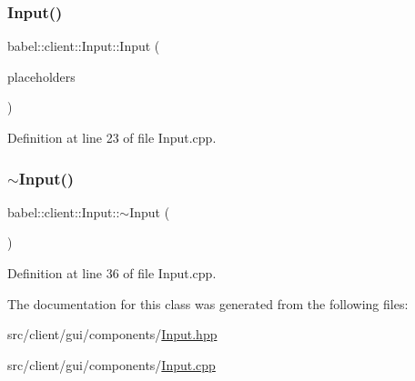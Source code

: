 \subsubsection{\texorpdfstring{Input()}{Input()}\hspace{0.1cm}{\footnotesize\ttfamily [2/2]}}
{\footnotesize\ttfamily babel\+::client\+::\+Input\+::\+Input (\begin{DoxyParamCaption}\item[{Q\+String}]{placeholders }\end{DoxyParamCaption})}



Definition at line 23 of file Input.\+cpp.

\mbox{\label{classbabel_1_1client_1_1_input_a38497832f8053477348959d02832b791}} 
\subsubsection{\texorpdfstring{$\sim$\+Input()}{~Input()}}
{\footnotesize\ttfamily babel\+::client\+::\+Input\+::$\sim$\+Input (\begin{DoxyParamCaption}{ }\end{DoxyParamCaption})}



Definition at line 36 of file Input.\+cpp.



The documentation for this class was generated from the following files\+:\begin{DoxyCompactItemize}
\item 
src/client/gui/components/\mbox{\hyperlink{_input_8hpp}{Input.\+hpp}}\item 
src/client/gui/components/\mbox{\hyperlink{_input_8cpp}{Input.\+cpp}}\end{DoxyCompactItemize}
